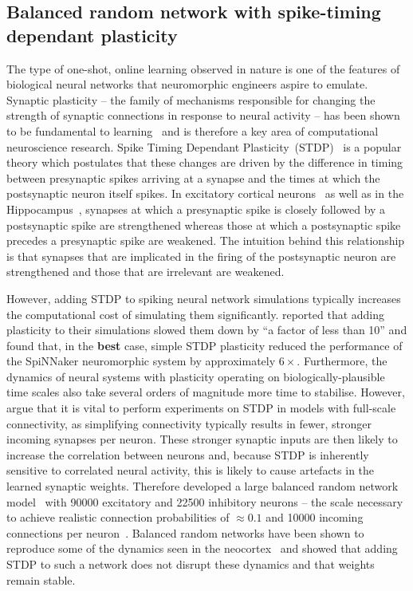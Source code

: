 \documentclass[utf8]{frontiersSCNS} %
\begin{document}
\subsection{Balanced random network with spike-timing dependant plasticity}
\label{sec:method/balanced_random}
The type of one-shot, online learning observed in nature is one of the features of biological neural networks that neuromorphic engineers aspire to emulate.
Synaptic plasticity -- the family of mechanisms responsible for changing the strength of synaptic connections in response to neural activity -- has been shown to be fundamental to learning~\citep{Nabavi2014} and is therefore a key area of computational neuroscience research.
Spike Timing Dependant Plasticity~(STDP)~\citep{Bi1998} is a popular theory which postulates that these changes are driven by the difference in timing between presynaptic spikes arriving at a synapse and the times at which the postsynaptic neuron itself spikes.
In excitatory cortical neurons~\citep{Markram1997} as well as in the Hippocampus~\citep{Bi1998}, synapses at which a presynaptic spike is closely followed by a postsynaptic spike are strengthened whereas those at which a postsynaptic spike precedes a presynaptic spike are weakened.
The intuition behind this relationship is that synapses that are implicated in the firing of the postsynaptic neuron are strengthened and those that are irrelevant are weakened.

However, adding STDP to spiking neural network simulations typically increases the computational cost of simulating them significantly. 
\citet{Morrison2007} reported that adding plasticity to their simulations slowed them down by ``a factor of less than 10'' and \citet{Knight2016b} found that, in the \textbf{best} case, simple STDP plasticity reduced the performance of the SpiNNaker neuromorphic system by approximately $6\times$.
Furthermore, the dynamics of neural systems with plasticity operating on biologically-plausible time scales also take several orders of magnitude more time to stabilise.
However, \citeauthor{Morrison2007} argue that it is vital to perform experiments on STDP in models with full-scale connectivity, as simplifying connectivity typically results in fewer, stronger incoming synapses per neuron.
These stronger synaptic inputs are then likely to increase the correlation between neurons and, because STDP is inherently sensitive to correlated neural activity, this is likely to cause artefacts in the learned synaptic weights.
Therefore \citeauthor{Morrison2007} developed a large balanced random network model~\citep{Brunel2000} with \num{90000} excitatory and \num{22500} inhibitory neurons -- the scale necessary to achieve realistic connection probabilities of $\approx0.1$ and \num{10000} incoming connections per neuron~\citep{braitenberg2013cortex}.
Balanced random networks have been shown to reproduce some of the dynamics seen in the neocortex~\citep{Brunel1999,Brunel2000} and \citeauthor{Morrison2007} showed that adding STDP to such a network does not disrupt these dynamics and that weights remain stable.
\end{document}
